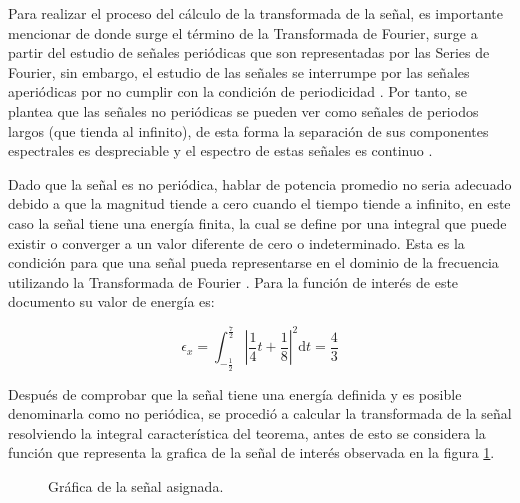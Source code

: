 \documentclass[11pt,letterpaper,twocolumn]{article}
\begin{document}
    Para realizar el proceso del cálculo de la transformada de la señal, es importante mencionar
    de donde surge el término de la Transformada de Fourier, surge a partir del estudio de señales
    periódicas que son representadas por las Series de Fourier, sin embargo, el estudio de las 
    señales se interrumpe por las señales aperiódicas por no cumplir con la condición de periodicidad
    \cite{Sauchelli2020}. Por tanto, se plantea que las señales no periódicas se pueden ver como 
    señales de periodos largos (que tienda al infinito), de esta forma la separación de sus 
    componentes espectrales es despreciable y el espectro de estas señales es continuo \cite{Silva2021}.
    
    Dado que la señal es no periódica, hablar de potencia promedio no seria adecuado debido a que 
    la magnitud tiende a cero cuando el tiempo tiende a infinito, en este caso la señal tiene una
    energía finita, la cual se define por una integral que puede existir o converger a un valor
    diferente de cero o indeterminado. Esta es la condición para que una señal pueda representarse
    en el dominio de la frecuencia utilizando la Transformada de Fourier \cite{Fabian}. Para la función de interés
    de este documento su valor de energía es:
    
    \begin{equation*}
        \epsilon_x=\int_{-\frac{1}{2}}^{\frac{7}{2}}\left|\frac{1}{4}t + \frac{1}{8}\right|^2 \mathrm{d}t = \frac{4}{3}
    \end{equation*}

    Después de comprobar que la señal tiene una energía definida y es posible denominarla como no
    periódica, se procedió a calcular la transformada de la señal resolviendo la integral 
    característica del teorema, antes de esto se considera la función que representa la grafica 
    de la señal de interés observada en la figura \ref{funcionAsiganda}.

    \begin{figure}[h!]
        \centering
        \caption{Gráfica de la señal asignada.}
        \label{funcionAsiganda}
    \end{figure}
\end{document}
